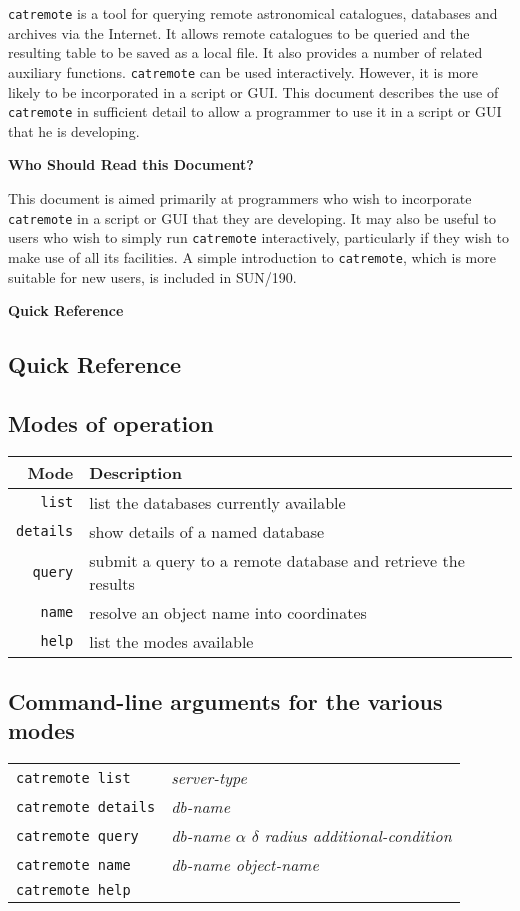 \documentclass[twoside,11pt]{article}
\newcommand{\stardocabstract}
{{\tt catremote} is a tool for querying remote astronomical catalogues,
databases and archives via the Internet.  It allows remote catalogues
to be queried and the resulting table to be saved as a local file.  It also
provides a number of related auxiliary functions.  {\tt catremote} can
be used interactively.  However, it is more likely to be incorporated in
a script or GUI.  This document describes the use of {\tt catremote} in
sufficient detail to allow a programmer to use it in a script or GUI that
he is developing.

\begin{latexonly}
\vspace{5mm}
\end{latexonly}

\begin{center}
{\bf Who Should Read this Document?}
\end{center}

This document is aimed primarily at programmers who wish to incorporate
{\tt catremote} in a script or GUI that they are developing.  It may also
be useful to users who wish to simply run {\tt catremote} interactively,
particularly if they wish to make use of all its facilities.  A simple
introduction to {\tt catremote}, which is more suitable for new users,
is included in \xref{SUN/190}{sun190}{}.}
\newenvironment{latexonly}{}{}
\newcommand{\xref}[3]{#1}
\renewcommand{\_}{\texttt{\symbol{95}}}
\begin{document}
\stardocabstract

\newpage
\begin{latexonly}
\begin{center}
{\Large\bf Quick Reference}
\end{center}
\end{latexonly}

\begin{htmlonly}
\section*{Quick Reference}
\end{htmlonly}

\subsection*{Modes of operation}

\begin{center}
\begin{tabular}{rl}
Mode          &  Description \\ \hline
{\tt list}    & list the databases currently available \\
{\tt details} & show details of a named database \\
{\tt query}   & submit a query to a remote database and retrieve the results \\
{\tt name}    & resolve an object name into coordinates \\
{\tt help}    & list the modes available \\
\end{tabular}
\end{center}

\subsection*{Command-line arguments for the various modes}

\begin{center}
\begin{tabular}{ll}
{\tt catremote list}    & {\it server-type} \\
{\tt catremote details} & {\it db-name} \\
{\tt catremote query}   & {\it db-name $\alpha$ $\delta$ radius
    additional-condition} \\
{\tt catremote name}    & {\it db-name object-name} \\
{\tt catremote help}    & \\
\end{tabular}
\end{center}
\end{document}

